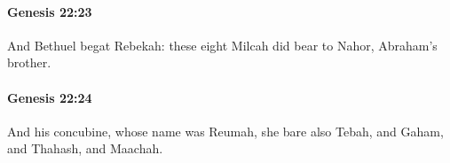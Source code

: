 		\paragraph{Genesis 22:23} %
			\label{GENESIS-22-23}

			And Bethuel begat Rebekah: these eight Milcah did bear to Nahor, Abraham's brother.


		\paragraph{Genesis 22:24} %
			\label{GENESIS-22-24}

			And his concubine, whose name was Reumah, she bare also Tebah, and Gaham, and Thahash, and Maachah.

